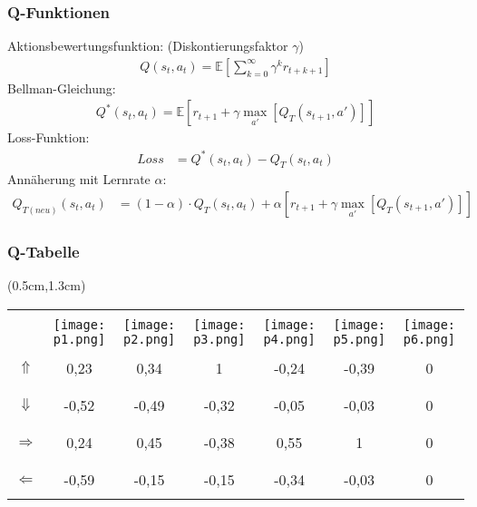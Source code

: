 \documentclass{beamer}
\begin{document}
\begin{frame}%
\frametitle{Q-Funktionen}
Aktionsbewertungsfunktion: (Diskontierungsfaktor $\gamma$)
\begin{align*}
Q(s_t,a_t) = \mathbb{E} \left[ \sum\limits_{k=0}^{\infty} \gamma^{k} r_{t+k+1} \right]
\end{align*}
Bellman-Gleichung:
\begin{align*}
Q^{*}(s_t,a_t) = \mathbb{E} \left[ r_{t+1} + \gamma \max\limits_{a'} \left[ Q_T(s_{t+1}, a') \right] \right]
\end{align*}
Loss-Funktion:
\begin{align*}
Loss &= Q^{*}(s_t,a_t) - Q_T(s_t,a_t)
\end{align*}
Annäherung mit Lernrate $\alpha$:
\begin{align*}
Q_{T(neu)}(s_t,a_t) &= (1 - \alpha) \cdot Q_T(s_t,a_t) + \alpha \left[ r_{t+1} + \gamma \max\limits_{a'} \left[ Q_T(s_{t+1}, a') \right] \right]
\end{align*}
\end{frame}

\begin{frame}%
\frametitle{Q-Tabelle}
\begin{textblock*}{2cm}(0.5cm,1.3cm)
\begin{tabular}{|c|c|c|c|c|c|c|}
\hline
&&&&&&\\
& \texttt{[image: p1.png]} & \texttt{[image: p2.png]} & \texttt{[image: p3.png]} & \texttt{[image: p4.png]} & \texttt{[image: p5.png]} & \texttt{[image: p6.png]} \\
\hline
&&&&&&\\
{\huge $\Uparrow$} & 0,23 & 0,34 & 1 & -0,24 & -0,39 & 0\\
&&&&&&\\
\hline
&&&&&&\\
{\huge $\Downarrow$} & -0,52 & -0,49 & -0,32 & -0,05 & -0,03 & 0\\
&&&&&&\\
\hline
&&&&&&\\
{\huge $\Rightarrow$} & 0,24 & 0,45 & -0,38 & 0,55 & 1 & 0\\
&&&&&&\\
\hline
&&&&&&\\
{\huge $\Leftarrow$} & -0,59 & -0,15 & -0,15 & -0,34 & -0,03 & 0\\
&&&&&&\\
\hline
\end{tabular}
\end{textblock*}
\end{frame}
\end{document}
